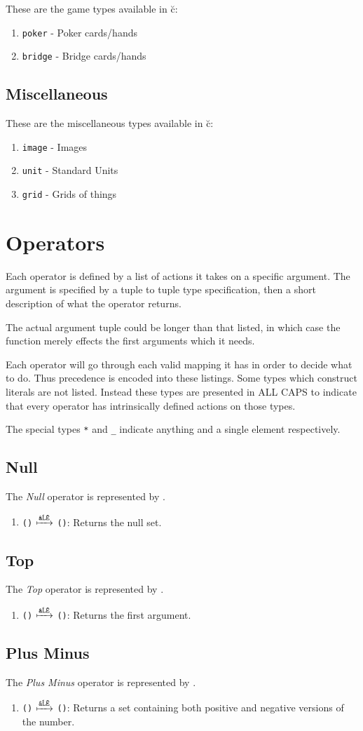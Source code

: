 \documentclass{article}
\newenvironment{operator}[2]{%
    \newcommand{\applymapto}{\ensuremath{\xmapsto{\texttt{\detokenize{#2}}}}}
    \subsection{#1}
    The \textit{#1} operator is represented by \colorbox{gray!30} {\texttt{\detokenize{#2}}}.
    \begin{enumerate}}{\end{enumerate}}
\providecommand{\op}[2]{\item\texttt{(\detokenize{#1})} $\applymapto $
\texttt{(\detokenize{#2})}}
\providecommand{\op}[2]{\item\texttt{(\detokenize{#1})} $\applymapto $
\texttt{(\detokenize{#2})}}
\begin{document}
These are the game types available in \u{c}:
\begin{enumerate}
    \item \texttt{poker} - Poker cards/hands
    \item \texttt{bridge} - Bridge cards/hands
\end{enumerate}

\subsection{Miscellaneous}

These are the miscellaneous types available in \u{c}:
\begin{enumerate}
    \item \texttt{image} - Images
    \item \texttt{unit} - Standard Units
    \item \texttt{grid} - Grids of things
\end{enumerate}

\section{Operators}

Each operator is defined by a list of actions it takes on a specific argument.
The argument is specified by a tuple to tuple type specification, then a short
description of what the operator returns.

The actual argument tuple could be longer than that listed, in which case the
function merely effects the first arguments which it needs.

Each operator will go through each valid mapping it has in order to decide what
to do. Thus precedence is encoded into these listings. Some types which
construct literals are not listed. Instead these types are presented in ALL CAPS
to indicate that every operator has intrinsically defined actions on those
types.

The special types \texttt{*} and \texttt{\_} indicate anything and a single
element respectively.

\begin{operator}{Null}{∅}
    \op{}{set}: Returns the null set.
\end{operator}

\begin{operator}{Top}{¡}
    \op{_,*}{_}: Returns the first argument.
\end{operator}

\begin{operator}{Plus Minus}{±}
    \op{number}{{number}}: Returns a set containing both positive and negative versions of the number.
\end{operator}
\end{document}
